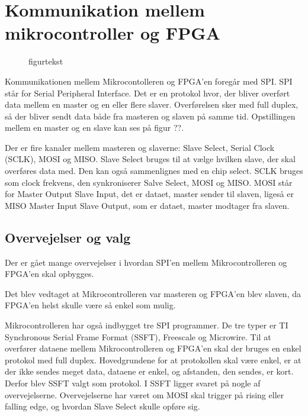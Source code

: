 \section{Kommunikation mellem mikrocontroller og FPGA}

\begin{figure}[!th]
\centering
\begin{tikzpicture}[scale=1]

\end{tikzpicture}
\caption[tekst i indholdsfortegnelsen]{figurtekst}
\label{fig:}
\end{figure}


Kommunikationen mellem Mikrocontolleren og FPGA’en foregår med SPI. SPI står for Serial Peripheral Interface. Det er en protokol hvor, der bliver overført data mellem en master og en eller flere slaver. Overførelsen sker med full duplex, så der bliver sendt data både fra masteren og slaven på samme tid. Opstillingen mellem en master og en slave kan ses på figur ??.

Der er fire kanaler mellem masteren og slaverne: Slave Select, Serial Clock (SCLK), MOSI og MISO. Slave Select bruges til at vælge hvilken slave, der skal overføres data med. Den kan også sammenlignes med en chip select. SCLK bruges som clock frekvens, den synkroniserer Salve Select, MOSI og MISO. MOSI står for Master Output Slave Input, det er dataet, master sender til slaven, ligeså er MISO Master Input Slave Output, som er dataet, master modtager fra slaven.
 

\subsection{Overvejelser og valg}
Der er gået mange overvejelser i hvordan SPI'en mellem Mikrocontrolleren og FPGA'en skal  opbygges.

Det blev vedtaget at Mikrocontrolleren var masteren og FPGA'en blev slaven, da FPGA'en helst skulle være så enkel som mulig.

Mikrocontrolleren har også indbygget tre SPI programmer. De tre typer er TI Synchronous Serial Frame Format (SSFT), Freescale og Microwire. Til at overfører dataene mellem Mikrocontrolleren og FPGA’en skal der bruges en enkel protokol med full duplex. Hovedgrundene for at protokollen skal være enkel, er at der ikke sendes meget data, dataene er enkel, og afstanden, den sendes, er kort. Derfor blev SSFT valgt som protokol. I SSFT ligger svaret på nogle af overvejelserne. Overvejelserne har været om MOSI skal trigger på rising eller falling edge, og hvordan Slave Select skulle opføre sig.

